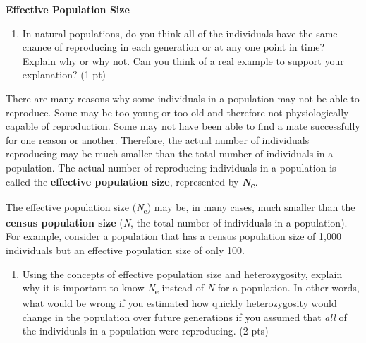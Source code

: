 \documentclass[11pt]{article}
\begin{document}
\textbf{Effective Population Size}\bigskip

\begin{enumerate}[resume]
\item In natural populations, do you think all of the individuals
have the same chance of reproducing in each generation or at any one
point in time? Explain why or why not. Can you think of a real example
to support your explanation? (1 pt)
\end{enumerate}
\newpage

There are many reasons why some individuals in a population may not be able to reproduce. Some may be too young or too old and therefore not physiologically capable of reproduction. Some may not have been able to find a mate successfully for one reason or another. Therefore, the actual number of individuals reproducing may be much smaller than the total number of individuals in a population. The actual number of reproducing individuals in a population is called the \textbf{effective population size}, represented by \textbf{\emph{N}\textsubscript{e}}.

The effective population size (\emph{N}\textsubscript{e}) may be, in many cases, much smaller than the \textbf{census population size} (\emph{N}, the total number of individuals in a population). For example, consider a population that has a census population size of 1,000 individuals but an effective population size of only 100.

\begin{enumerate}[resume]

\item Using the concepts of effective population size and
heterozygosity, explain why it is important to know
\emph{N}\textsubscript{e} instead of \emph{N} for a population. In other
words, what would be wrong if you estimated how quickly heterozygosity
would change in the population over future generations if you assumed
that \emph{all} of the individuals in a population were reproducing. (2
pts)
\end{enumerate}
\end{document}
